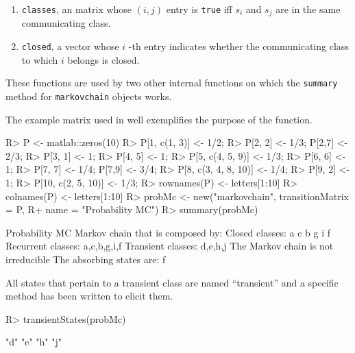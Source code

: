 \documentclass[
  nojss]{jss}
\providecommand{\tightlist}{%
  \setlength{\itemsep}{0pt}\setlength{\parskip}{0pt}}
\begin{document}
\begin{enumerate}
\def\labelenumi{\arabic{enumi}.}
\tightlist
\item
  \texttt{classes}, an matrix whose \((i, j)\) entry is \texttt{true} iff \(s_i\) and \(s_j\) are in the same communicating class.
\item
  \texttt{closed}, a vector whose \(i\) -th entry indicates whether the communicating class to which \(i\) belongs is closed.
\end{enumerate}

These functions are used by two other internal functions on which the \texttt{summary} method for \texttt{markovchain} objects works.

The example matrix used in \cite{renaldoMatlab} well exemplifies the purpose of the function.

\begin{CodeChunk}

\begin{CodeInput}
R> P <- matlab::zeros(10)
R> P[1, c(1, 3)] <- 1/2;
R> P[2, 2] <- 1/3; P[2,7] <- 2/3;
R> P[3, 1] <- 1;
R> P[4, 5] <- 1;
R> P[5, c(4, 5, 9)] <- 1/3;
R> P[6, 6] <- 1;
R> P[7, 7] <- 1/4; P[7,9] <- 3/4;
R> P[8, c(3, 4, 8, 10)] <- 1/4;
R> P[9, 2] <- 1;
R> P[10, c(2, 5, 10)] <- 1/3;
R> rownames(P) <- letters[1:10] 
R> colnames(P) <- letters[1:10]
R> probMc <- new("markovchain", transitionMatrix = P, 
R+               name = "Probability MC")
R> summary(probMc)
\end{CodeInput}

\begin{CodeOutput}
Probability MC  Markov chain that is composed by: 
Closed classes: 
a c 
b g i 
f 
Recurrent classes: 
{a,c},{b,g,i},{f}
Transient classes: 
{d,e},{h},{j}
The Markov chain is not irreducible 
The absorbing states are: f
\end{CodeOutput}
\end{CodeChunk}

All states that pertain to a transient class are named ``transient'' and a
specific method has been written to elicit them.

\begin{CodeChunk}

\begin{CodeInput}
R> transientStates(probMc)
\end{CodeInput}

\begin{CodeOutput}
[1] "d" "e" "h" "j"
\end{CodeOutput}
\end{CodeChunk}
\end{document}
